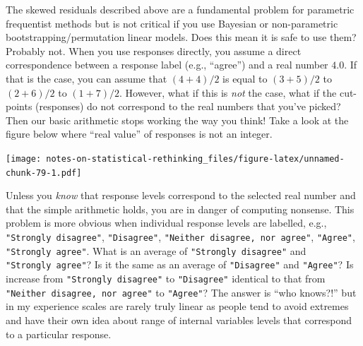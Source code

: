 \documentclass[
]{book}
\begin{document}
The skewed residuals described above are a fundamental problem for parametric frequentist methods but is not critical if you use Bayesian or non-parametric bootstrapping/permutation linear models. Does this mean it is safe to use them? Probably not. When you use responses directly, you assume a direct correspondence between a response label (e.g., ``agree'') and a real number \(4.0\). If that is the case, you can assume that \((4 + 4) / 2\) is equal to \((3 + 5) / 2\) to \((2 + 6) / 2\) to \((1 + 7)/ 2\). However, what if this is \emph{not} the case, what if the cut-points (responses) do not correspond to the real numbers that you've picked? Then our basic arithmetic stops working the way you think! Take a look at the figure below where ``real value'' of responses is not an integer.

\texttt{[image: notes-on-statistical-rethinking\_files/figure-latex/unnamed-chunk-79-1.pdf]}

Unless you \emph{know} that response levels correspond to the selected real number and that the simple arithmetic holds, you are in danger of computing nonsense. This problem is more obvious when individual response levels are labelled, e.g., \texttt{"Strongly\ disagree"}, \texttt{"Disagree"}, \texttt{"Neither\ disagree,\ nor\ agree"}, \texttt{"Agree"}, \texttt{"Strongly\ agree"}. What is an average of \texttt{"Strongly\ disagree"} and \texttt{"Strongly\ agree"}? Is it the same as an average of \texttt{"Disagree"} and \texttt{"Agree"}? Is increase from \texttt{"Strongly\ disagree"} to \texttt{"Disagree"} identical to that from \texttt{"Neither\ disagree,\ nor\ agree"} to \texttt{"Agree"}? The answer is ``who knows?!'' but in my experience scales are rarely truly linear as people tend to avoid extremes and have their own idea about range of internal variables levels that correspond to a particular response.
\end{document}
